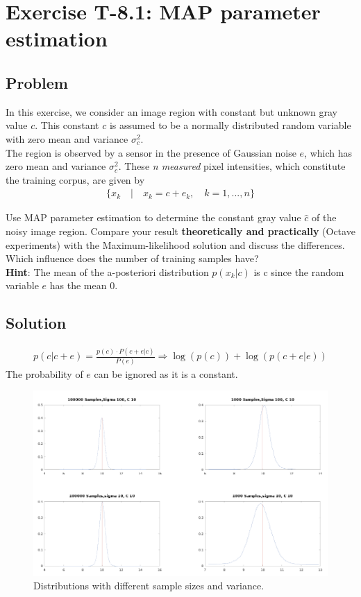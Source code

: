 \section*{Exercise T-8.1: MAP parameter estimation}

\subsection*{Problem}
In this exercise, we consider an image region with constant but unknown gray value $c$.
This constant $c$ is assumed to be a normally distributed random variable with zero mean and variance $\sigma_c^2$.\\

The region is observed by a sensor in the presence of Gaussian noise $e$, which has zero mean and variance $\sigma_c^2$.
These\textit{ n measured} pixel intensities, which constitute the training corpus, are given by
\begin{align*}
	\{x_k\quad |\quad x_k = c + e_k,\quad k = 1,...,n\}
\end{align*}

Use MAP parameter estimation to determine the constant gray value $\hat{c}$ of the noisy image region.
Compare your result \textbf{theoretically and practically} (Octave experiments) with the Maximum-likelihood solution and discuss the differences.
Which influence does the number of training samples have?\\

\textbf{Hint}: The mean of the a-posteriori distribution $p(x_k|c)$ is c since the random variable $e$ has the mean 0.

\subsection*{Solution}
\begin{align*}
 p(c|c+e) = \frac{p(c)\cdot P(c+e|c)}{P(e)}\Rightarrow\log(p(c))+\log(p(c+e|e))
\end{align*}
The probability of $e$ can be ignored as it is a constant.


\begin{figure}[t]
	\includegraphics[width=1\linewidth]{files/curves}
	\caption{Distributions with different sample sizes and variance.}
	\label{img:curves}
\end{figure}